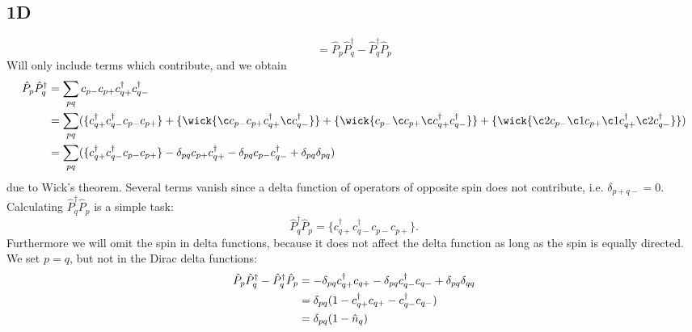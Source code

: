 \documentclass[norsk,a4paper,12pt]{article}
\begin{document}
\subsection*{1D}
\begin{equation}
[\hat{P}_p,\hat{P}_q^{\dagger}]=\hat{P}_p\hat{P}_q^{\dagger}-\hat{P}_q^{\dagger}\hat{P}_p
\end{equation}
Will only include terms which contribute, and we obtain
\begin{align}
\hat{P}_p\hat{P}_q^{\dagger}&=\sum_{pq}c_{p-}c_{p+}c_{q+}^{\dagger}c_{q-}^{\dagger}\notag\\
&=\sum_{pq}(\{c_{q+}^{\dagger}c_{q-}^{\dagger}c_{p-}c_{p+}\}+\{\wick{\c c_{p-}c_{p+}c_{q+}^{\dagger}\c c_{q-}^{\dagger}}\}+\{\wick{c_{p-}\c c_{p+}\c c_{q+}^{\dagger}c_{q-}^{\dagger}}\}+\{\wick{\c2 c_{p-}\c1 c_{p+}\c1 c_{q+}^{\dagger}\c2 c_{q-}^{\dagger}}\})\notag\\
&=\sum_{pq}(\{c_{q+}^{\dagger}c_{q-}^{\dagger}c_{p-}c_{p+}\}-\delta_{pq}c_{p+}c_{q+}^{\dagger}-\delta_{pq}c_{p-}c_{q-}^{\dagger}+\delta_{pq}\delta_{pq})
\end{align}
due to Wick's theorem. Several terms vanish since a delta function of operators of opposite spin does not contribute, i.e. $\delta_{p+q-}=0$. Calculating $\hat{P}_q^{\dagger}\hat{P}_p$ is a simple task:
\begin{equation}
\hat{P}_q^{\dagger}\hat{P}_p=\{c_{q+}^{\dagger}c_{q-}^{\dagger}c_{p-}c_{p+}\}.
\end{equation}
Furthermore we will omit the spin in delta functions, because it does not affect the delta function as long as the spin is equally directed. We set $p=q$, but not in the Dirac delta functions:
\begin{align}
\hat{P}_p\hat{P}_q^{\dagger}-\hat{P}_q^{\dagger}\hat{P}_p&=-\delta_{pq}c_{q+}^{\dagger}c_{q+}-\delta_{pq}c_{q-}^{\dagger}c_{q-}+\delta_{pq}\delta_{qq}\notag\\
&=\delta_{pq}(1-c_{q+}^{\dagger}c_{q+}-c_{q-}^{\dagger}c_{q-})\notag\\
&=\delta_{pq}(1-\hat{n}_q)\label{eq:ex1d}
\end{align}
\end{document}
